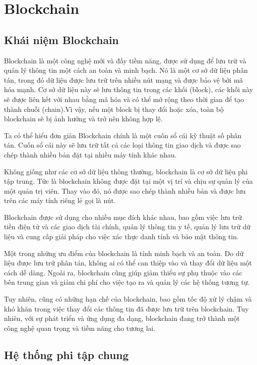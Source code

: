 \section{Blockchain}
\subsection{Khái niệm Blockchain}

Blockchain là một công nghệ mới và đầy tiềm năng, được sử dụng để lưu 
trữ và quản lý thông tin một cách an toàn và minh bạch. Nó là một cơ 
sở dữ liệu phân tán, trong đó dữ liệu được lưu trữ trên nhiều nút 
mạng và được bảo vệ bởi mã hóa mạnh. Cơ sở dữ liệu này sẽ lưu thông tin trong các khối (block), các khối 
này sẽ được liên kết với nhau bằng mã hóa và có thể mở rộng theo 
thời gian để tạo thành chuỗi (chain).Vì vậy, 
nếu một block bị thay đổi hoặc xóa, toàn bộ blockchain sẽ bị ảnh 
hưởng và trở nên không hợp lệ.

Ta có thể hiểu đơn giản Blockchain chính là một cuốn sổ cái kỹ thuật 
số phân tán. Cuốn sổ cái này sẽ lưu trữ tất cả các loại thông tin 
giao dịch và được sao chép thành nhiều bản đặt tại nhiều máy tính khác nhau. 

Không giống như các cơ sở dữ liệu thông thường, blockchain là cơ sở dữ liệu phi tập trung. 
Tức là blockchain không được đặt tại một vị trí và chịu sự quản lý của một quản trị viên. 
Thay vào đó, nó được sao chép thành nhiều bản và được lưu trên các máy tính riêng lẻ gọi là nút. 


Blockchain được sử dụng cho nhiều mục đích khác nhau, bao gồm việc 
lưu trữ tiền điện tử và các giao dịch tài chính, quản lý thông tin 
y tế, quản lý lưu trữ dữ liệu và cung cấp giải pháp cho việc xác 
thực danh tính và bảo mật thông tin.

Một trong những ưu điểm của blockchain là tính minh bạch và an toàn. 
Do dữ liệu được lưu trữ phân tán, không ai có thể can thiệp vào và 
thay đổi dữ liệu một cách dễ dàng. Ngoài ra, blockchain cũng giúp 
giảm thiểu sự phụ thuộc vào các bên trung gian và giảm chi phí cho 
việc tạo ra và quản lý các hệ thống tương tự.

Tuy nhiên, cũng có những hạn chế của blockchain, bao gồm tốc độ xử 
lý chậm và khó khăn trong việc thay đổi các thông tin đã được lưu 
trữ trên blockchain. Tuy nhiên, với sự phát triển và ứng dụng đa 
dạng, blockchain đang trở thành một công nghệ quan trọng và tiềm 
năng cho tương lai.
\subsection{Hệ thống phi tập chung}


